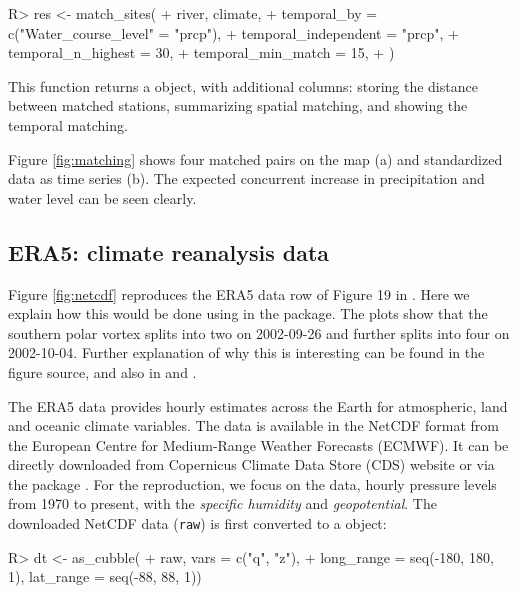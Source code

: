 \documentclass[
  shortnames]{jss}
\begin{document}
\begin{CodeChunk}
\begin{CodeInput}
R> res <- match_sites(
+   river, climate,
+   temporal_by = c("Water_course_level" = "prcp"),
+   temporal_independent = "prcp",  
+   temporal_n_highest = 30,
+   temporal_min_match = 15, 
+ )
\end{CodeInput}
\end{CodeChunk}

This function returns a  object, with additional columns:  storing the distance between matched stations,  summarizing spatial matching, and  showing the temporal matching.

Figure \ref{fig:matching} shows four matched pairs on the map (a) and standardized data as time series (b). The expected concurrent increase in precipitation and water level can be seen clearly.

\hypertarget{era5-climate-reanalysis-data}{%
\subsection{ERA5: climate reanalysis data}\label{era5-climate-reanalysis-data}}

Figure \ref{fig:netcdf} reproduces the ERA5 data row of Figure 19 in \citet{hersbach2020era5}. Here we explain how this would be done using in the  package. The plots show that the southern polar vortex splits into two on 2002-09-26 and further splits into four on 2002-10-04. Further explanation of why this is interesting can be found in the figure source, and also in \citet{simmons2020global} and \citet{simmons2005ecmwf}.

The ERA5 data \citep{hersbach2020era5} provides hourly estimates across the Earth for atmospheric, land and oceanic climate variables. The data is available in the NetCDF format from the European Centre for Medium-Range Weather Forecasts (ECMWF). It can be directly downloaded from Copernicus Climate Data Store (CDS) \citep{cds} website or via the  package \citep{ecwmfr}. For the reproduction, we focus on the  data, hourly pressure levels from 1970 to present, with the \emph{specific humidity} and \emph{geopotential}. The downloaded NetCDF data (\texttt{raw}) is first converted to a  object:

\begin{CodeChunk}
\begin{CodeInput}
R> dt <- as_cubble(
+   raw, vars = c("q", "z"),
+   long_range = seq(-180, 180, 1), lat_range = seq(-88, 88, 1))
\end{CodeInput}
\end{CodeChunk}
\end{document}
